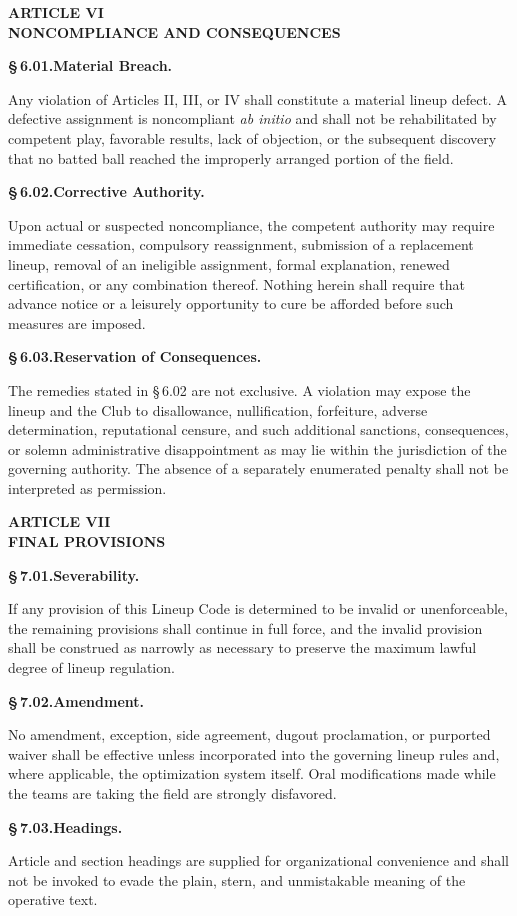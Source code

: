 \documentclass[11pt]{article}
\newcommand{\articleheading}[1]{%
  \vspace{6pt}
  \begin{center}
    \large\bfseries #1
  \end{center}
  \vspace{-3pt}
}
\newcommand{\sectionheading}[2]{%
  \vspace{4pt}
  \noindent\textbf{\S\,#1.\quad #2}\par
}
\begin{document}
\articleheading{ARTICLE VI\\NONCOMPLIANCE AND CONSEQUENCES}

\sectionheading{6.01}{Material Breach.}
Any violation of Articles II, III, or IV shall constitute a material lineup
defect. A defective assignment is noncompliant \emph{ab initio} and shall not
be rehabilitated by competent play, favorable results, lack of objection, or
the subsequent discovery that no batted ball reached the improperly arranged
portion of the field.

\sectionheading{6.02}{Corrective Authority.}
Upon actual or suspected noncompliance, the competent authority may require
immediate cessation, compulsory reassignment, submission of a replacement
lineup, removal of an ineligible assignment, formal explanation, renewed
certification, or any combination thereof. Nothing herein shall require that
advance notice or a leisurely opportunity to cure be afforded before such
measures are imposed.

\sectionheading{6.03}{Reservation of Consequences.}
The remedies stated in \S\,6.02 are not exclusive. A violation may expose the
lineup and the Club to disallowance, nullification, forfeiture, adverse
determination, reputational censure, and such additional sanctions,
consequences, or solemn administrative disappointment as may lie within the
jurisdiction of the governing authority. The absence of a separately
enumerated penalty shall not be interpreted as permission.

\articleheading{ARTICLE VII\\FINAL PROVISIONS}

\sectionheading{7.01}{Severability.}
If any provision of this Lineup Code is determined to be invalid or
unenforceable, the remaining provisions shall continue in full force, and the
invalid provision shall be construed as narrowly as necessary to preserve the
maximum lawful degree of lineup regulation.

\sectionheading{7.02}{Amendment.}
No amendment, exception, side agreement, dugout proclamation, or purported
waiver shall be effective unless incorporated into the governing lineup rules
and, where applicable, the optimization system itself. Oral modifications
made while the teams are taking the field are strongly disfavored.

\sectionheading{7.03}{Headings.}
Article and section headings are supplied for organizational convenience and
shall not be invoked to evade the plain, stern, and unmistakable meaning of
the operative text.
\end{document}
